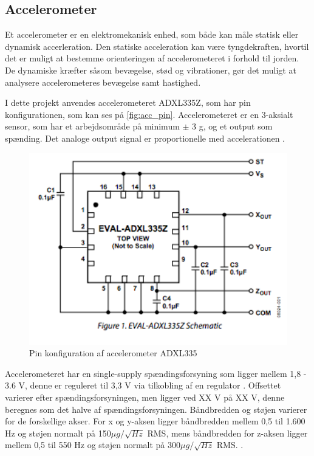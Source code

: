 \subsection{Accelerometer}
Et accelerometer er en elektromekanisk enhed, som både kan måle statisk eller dynamisk accerleration. Den statiske acceleration kan være tyngdekraften, hvortil det er muligt at bestemme orienteringen af accelerometeret i forhold til jorden. De dynamiske kræfter såsom bevægelse, stød og vibrationer, gør det muligt at analysere accelerometeres bevægelse samt hastighed. 

I dette projekt anvendes accelerometeret ADXL335Z, som har pin konfigurationen, som kan ses på \autoref{fig:acc_pin}. Accelerometeret er en 3-aksialt sensor, som har et arbejdsområde på minimum $\pm$ 3 g, og et output som spænding. Det analoge output signal er proportionelle med accelerationen \citep{analogdevices2010}. 


\begin{figure}[H]
\centering
\includegraphics[width=1\textwidth]{figures/acc_pin.png}
\caption{Pin konfiguration af accelerometer ADXL335}
\label{fig:acc_pin}
\end{figure}

\noindent
Accelerometeret har en single-supply spændingsforsyning som ligger mellem 1,8 - 3.6 V, denne er reguleret til 3,3 V via tilkobling af en regulator . Offsettet varierer efter spændingsforsyningen, men ligger ved XX V på  XX V, denne beregnes som det halve af spændingsforsyningen. Båndbredden og støjen varierer for de forskellige akser. For x og y-aksen ligger båndbredden mellem 0,5 til 1.600 Hz og støjen normalt på 150$\mu g/\sqrt{Hz}$ RMS, mens båndbredden for z-aksen ligger mellem 0,5 til 550 Hz og støjen normalt på $300\mu g/\sqrt{Hz}$ RMS.  . 

